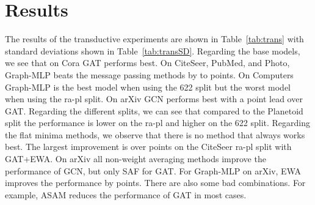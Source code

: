 \documentclass[runningheads]{llncs}
\newcommand{\GraphMLP}{Graph-MLP\xspace}
\begin{document}
\section{Results}
\label{sec:results}







The results of the transductive experiments are shown in Table~\ref{tab:trans} with standard deviations shown in Table~\ref{tab:transSD}. 
Regarding the base models, we see that on Cora GAT performs best.
On CiteSeer, PubMed, and Photo, \GraphMLP beats the message passing methods by  to  points.
On Computers \GraphMLP is the best model when using the 622 split but the worst model when using the ra-pl split.
On arXiv GCN performs best with a  point lead over GAT.
Regarding the different splits, we can see that compared to the Planetoid split the performance is lower on the ra-pl and higher on the 622 split.
Regarding the flat minima methods, we observe that there is no method that always works best.
The largest improvement is over  points on the CiteSeer ra-pl split with GAT+EWA.
On arXiv all non-weight averaging methods improve the performance of GCN, but only SAF for GAT.
For \GraphMLP on arXiv, EWA improves the performance by  points.
There are also some bad combinations.
For example, ASAM reduces the performance of GAT in most cases.
\end{document}
